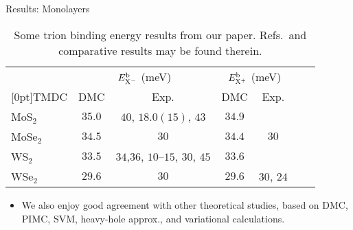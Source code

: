 \documentclass[12pt, pdf, hyperref={draft}, usenames, dvipsnames]{beamer}
\begin{document}
\begin{frame}{Results: Monolayers}

\begin{table}[H]
  \centering
\begin{tabular}{lcccccc}
\hline \hline
& \multicolumn{2}{c}{$E_{\rm X^-}^{\rm b}$
  (meV)} & \multicolumn{2}{c}{$E_{\rm
    X^+}^{\rm b}$ (meV)} \\
\raisebox{1.5ex}[0pt]{TMDC} & DMC&
Exp. &
DMC & Exp. \\ \hline

MoS$_2$ & $35.0$ &
$40$, $18.0(15)$, $43$
& $34.9$ & \\

MoSe$_2$ & $34.5$ &
$30$ & $34.4$ &
$30$ \\

WS$_2$ & $33.5$ &
$34$,$36$,
$10$--$15$, $30$,
$45$ & $33.6$ & & \\

WSe$_2$ & $29.6$ &
$30$ & $29.6$ &
$30$, $24$ \\

\hline \hline
\end{tabular}
\caption{Some trion binding energy results from our paper. Refs.\ and comparative results may be found
therein.}
\label{tab:trion_results}
\end{table}

\begin{itemize}
  \item We also enjoy good agreement with other theoretical studies, based on
  DMC, PIMC, SVM, heavy-hole approx., and variational calculations.
\end{itemize}

\end{frame}
\end{document}
